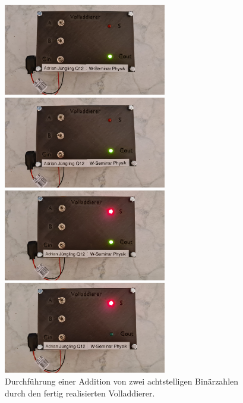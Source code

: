 \begin{figure}[h!]
\begin{minipage}{.5\textwidth}
		\vspace{.5cm}
	\end{minipage}
	\begin{minipage}{.5\textwidth}
		\centering
		\includegraphics[height=4cm, keepaspectratio]{./Fotos/FA-4.jpg}
		\vspace{.5cm}
	\end{minipage}%
	\begin{minipage}{.5\textwidth}
		\centering
		\includegraphics[height=4cm, keepaspectratio]{./Fotos/FA-5.jpg}
		\vspace{.5cm}
	\end{minipage}
	\begin{minipage}{.5\textwidth}
		\centering
		\includegraphics[height=4cm, keepaspectratio]{./Fotos/FA-6.jpg}
	\end{minipage}%
	\begin{minipage}{.5\textwidth}
		\centering
		\includegraphics[height=4cm, keepaspectratio]{./Fotos/FA-7.jpg}
	\end{minipage}
	\caption{Durchführung einer Addition von zwei achtstelligen Binärzahlen durch den fertig realisierten Volladdierer.}
\end{figure}
\newpage
